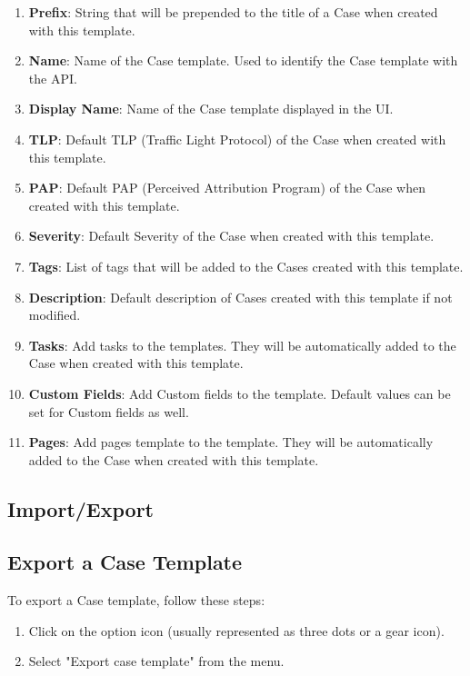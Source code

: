 \documentclass{article}
\begin{document}
\begin{enumerate}
  \item \textbf{Prefix}: String that will be prepended to the title of a Case when created with this template.
  \item \textbf{Name}: Name of the Case template. Used to identify the Case template with the API.
  \item \textbf{Display Name}: Name of the Case template displayed in the UI.
  \item \textbf{TLP}: Default TLP (Traffic Light Protocol) of the Case when created with this template.
  \item \textbf{PAP}: Default PAP (Perceived Attribution Program) of the Case when created with this template.
  \item \textbf{Severity}: Default Severity of the Case when created with this template.
  \item \textbf{Tags}: List of tags that will be added to the Cases created with this template.
  \item \textbf{Description}: Default description of Cases created with this template if not modified.
  \item \textbf{Tasks}: Add tasks to the templates. They will be automatically added to the Case when created with this template.
  \item \textbf{Custom Fields}: Add Custom fields to the template. Default values can be set for Custom fields as well.
  \item \textbf{Pages}: Add pages template to the template. They will be automatically added to the Case when created with this template.
\end{enumerate}

\subsection*{Import/Export}

\subsection*{Export a Case Template}

To export a Case template, follow these steps:

\begin{enumerate}
  \item Click on the option icon (usually represented as three dots or a gear icon).
  \item Select "Export case template" from the menu.
\end{enumerate}
\end{document}
